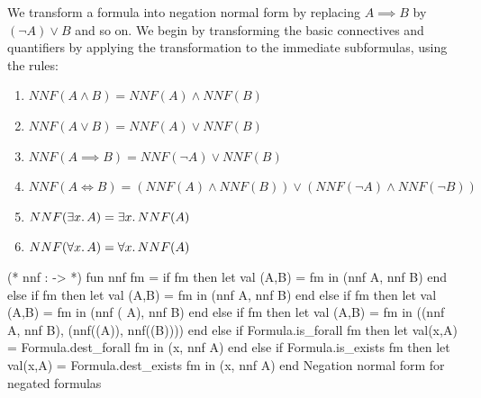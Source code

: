 \begin{node}%
We transform a formula into negation normal form by replacing
$A\implies B$ by $(\neg A)\lor B$ and so on. We begin by transforming
the basic connectives and quantifiers by applying the transformation
to the immediate subformulas, using the rules:
\begin{enumerate}
\item $NNF(A\land B)=NNF(A)\land NNF(B)$
\item $NNF(A\lor B)=NNF(A)\lor NNF(B)$
\item $NNF(A\implies B)=NNF(\neg A)\lor NNF(B)$
\item $NNF(A\iff B)=(NNF(A)\land NNF(B))\lor(NNF(\neg A)\land NNF(\neg B))$
\item $NNF(\exists x\ldotp A)=\exists x\ldotp NNF(A)$
\item $NNF(\forall x\ldotp A)=\forall x\ldotp NNF(A)$
\end{enumerate}
\end{node}

\nwenddocs{}\endmoddef\nwstartdeflinemarkup{}\nwenddeflinemarkup
(* nnf :  ->  *)
fun nnf fm =
  if  fm
  then let val (A,B) =  fm
       in (nnf A, nnf B) end
  else if  fm
  then let val (A,B) =  fm
       in (nnf A, nnf B) end
  else if  fm
  then let val (A,B) =  fm
       in (nnf ( A),
                        nnf B) end
  else if  fm
  then let val (A,B) =  fm
       in ((nnf A, nnf B),
                        (nnf((A)), nnf((B)))) end
  else if Formula.is_forall fm
  then let val(x,A) = Formula.dest_forall fm
       in (x, nnf A) end
  else if Formula.is_exists fm
  then let val(x,A) = Formula.dest_exists fm
       in (x, nnf A) end
  \LA{}Negation normal form for negated formulas~{\nwtagstyle{}}\RA{}

